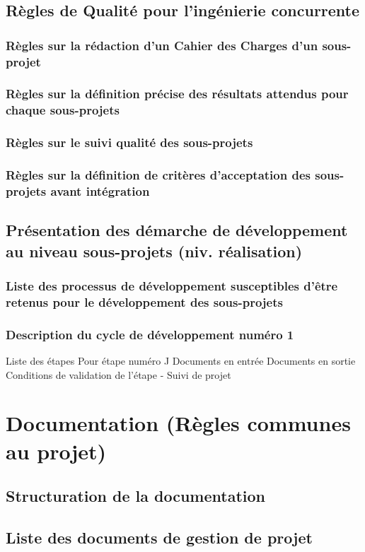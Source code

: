 \documentclass[a4paper]{article}
\begin{document}
\subsection{Règles de Qualité pour l'ingénierie concurrente}
\subsubsection{Règles sur la rédaction d'un Cahier des Charges d'un sous-projet}
\subsubsection{Règles sur la définition précise des résultats attendus pour chaque sous-projets}
\subsubsection{Règles sur le suivi qualité des sous-projets}
\subsubsection{Règles sur la définition de critères d'acceptation des sous-projets avant intégration}
\subsection{Présentation des démarche de développement au niveau sous-projets (niv. réalisation)}
\subsubsection{Liste des processus de développement susceptibles d'être retenus pour le développement des sous-projets}
\subsubsection{Description du cycle de développement numéro 1}
Liste des étapes
Pour étape numéro J
Documents en entrée
Documents en sortie
Conditions de validation de l'étape
      -     Suivi de projet


\section{Documentation (Règles communes au projet)}
\subsection{Structuration de la documentation}
\subsection{Liste des documents de gestion de projet}
\end{document}

